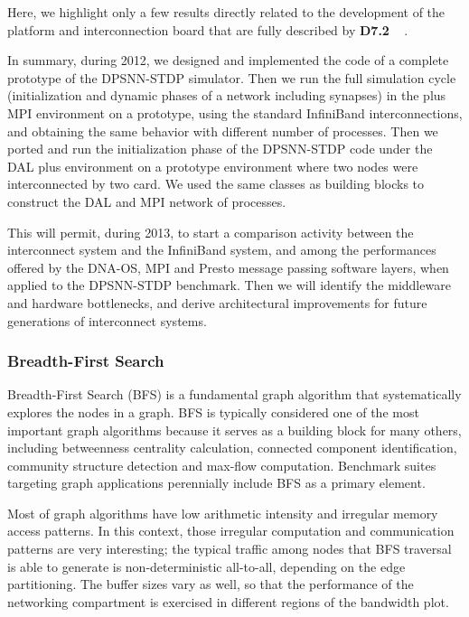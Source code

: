 Here, we highlight only a few results directly related to the
development of the \quong platform and \apenetp interconnection board
that are fully described by \textbf{D7.2} ~\cite{euretile:D7_2} .

In summary, during 2012, we designed and implemented the \cpp code of a
complete prototype of the DPSNN-STDP simulator. Then we run the full
simulation cycle (initialization and dynamic phases of a network
including  synapses) in the \cpp plus MPI environment on a
\quong prototype, using the standard InfiniBand interconnections, and
obtaining the same behavior with different number of processes. Then
we ported and run the initialization phase of the DPSNN-STDP code
under the DAL plus \cpp environment on a prototype environment where
two \quong nodes were interconnected by two \apenetp card. We used the
same \cpp classes as building blocks to construct the DAL and MPI
network of processes.

This will permit, during 2013, to start a comparison activity between
the \apenetp interconnect system and the InfiniBand system, and among
the performances offered by the DNA-OS, MPI and Presto message passing
software layers, when applied to the DPSNN-STDP benchmark. Then we
will identify the middleware and hardware bottlenecks, and derive
architectural improvements for future generations of interconnect
systems.

\subsubsection{Breadth-First Search}
Breadth-First Search (BFS) is a fundamental graph algorithm that
systematically explores the nodes in a graph.
BFS is typically considered one of the most important graph algorithms
because it serves as a building block for many others, including
betweenness centrality calculation, connected component
identification, community structure detection and max-flow
computation.
Benchmark suites targeting graph applications perennially include BFS
as a primary element.

Most of graph algorithms have low arithmetic intensity and irregular
memory access patterns.
In this context, those irregular computation and communication
patterns are very interesting; the typical traffic among nodes that
BFS traversal is able to generate is non-deterministic all-to-all,
depending on the edge partitioning.
The buffer sizes vary as well, so that the performance of the
networking compartment is exercised in different regions of the
bandwidth plot.

